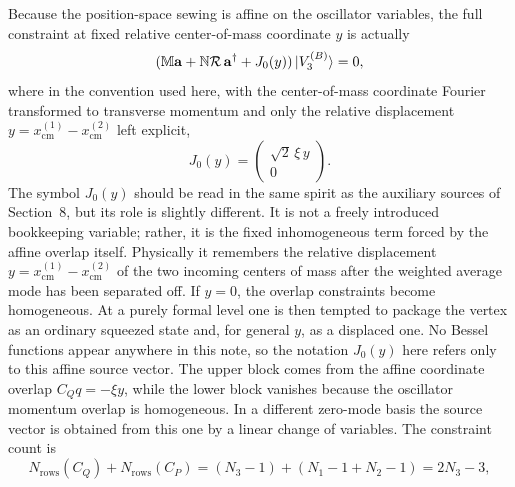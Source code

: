 \documentclass[11pt]{article}
\numberwithin{equation}{section}
\begin{document}
Because the position-space sewing is affine on the oscillator variables, the full constraint at fixed relative center-of-mass coordinate $y$ is actually
\begin{equation}
\label{eq:s11-011}
(\mathbb M {\bf a} + \mathbb N \mathcal R\,{\bf a}^\dagger + J_0(y))\,|V_3^{(B)}\rangle = 0,
\end{equation}
where in the convention used here, with the center-of-mass coordinate Fourier transformed to transverse momentum and only the relative displacement $y=x_{\mathrm{cm}}^{(1)}-x_{\mathrm{cm}}^{(2)}$ left explicit,
\begin{equation}
\label{eq:s11-012}
J_0(y)=
\begin{pmatrix}
\sqrt2\,\xi\,y\\
0
\end{pmatrix}.
\end{equation}
The symbol $J_0(y)$ should be read in the same spirit as the auxiliary sources of Section~8, but its role is slightly different. It is not a freely introduced bookkeeping variable; rather, it is the fixed inhomogeneous term forced by the affine overlap itself. Physically it remembers the relative displacement $y=x_{\mathrm{cm}}^{(1)}-x_{\mathrm{cm}}^{(2)}$ of the two incoming centers of mass after the weighted average mode has been separated off. If $y=0$, the overlap constraints become homogeneous. At a purely formal level one is then tempted to package the vertex as an ordinary squeezed state and, for general $y$, as a displaced one. No Bessel functions appear anywhere in this note, so the notation $J_0(y)$ here refers only to this affine source vector.
The upper block comes from the affine coordinate overlap $C_Qq=-\xi y$, while the lower block vanishes because the oscillator momentum overlap is homogeneous. In a different zero-mode basis the source vector is obtained from this one by a linear change of variables. The constraint count is
\begin{equation}
\label{eq:s11-013}
N_{\mathrm{rows}}(C_Q)+N_{\mathrm{rows}}(C_P)
=(N_3-1)+(N_1-1+N_2-1)=2N_3-3,
\end{equation}
\end{document}
